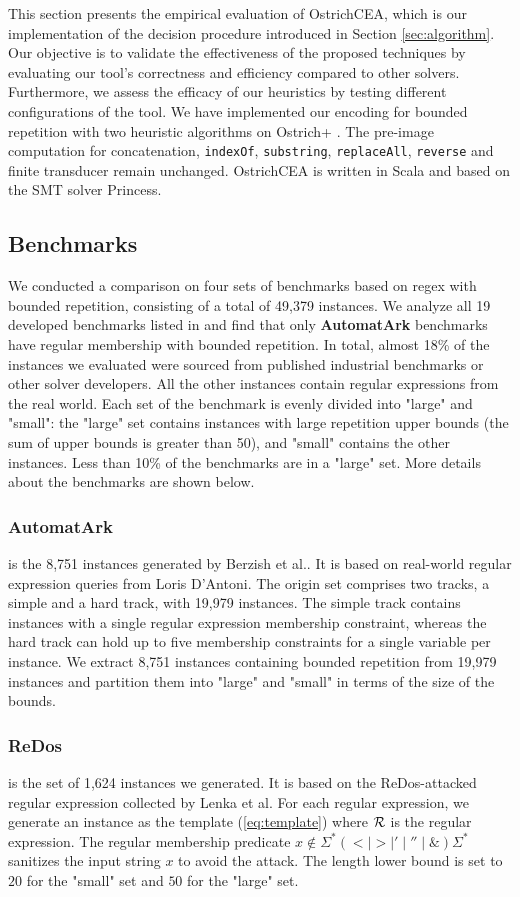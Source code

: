 \documentclass{standalone}
\begin{document}
This section presents the empirical evaluation of OstrichCEA, which is our implementation of the decision procedure introduced in Section \ref{sec:algorithm}. Our objective is to validate the effectiveness of the proposed techniques by evaluating our tool's correctness and efficiency compared to other solvers. Furthermore, we assess the efficacy of our heuristics by testing different configurations of the tool. We have implemented our encoding for bounded repetition with two heuristic algorithms on Ostrich+ \cite{atva2020}. The pre-image computation for concatenation, \verb|indexOf|, \verb|substring|, \verb|replaceAll|, \verb|reverse| and finite transducer remain unchanged. OstrichCEA is written in Scala and based on the SMT solver Princess\cite{princess}.
\subsection{Benchmarks}
We conducted a comparison on four sets of benchmarks based on regex with bounded repetition, consisting of a total of 49,379 instances. We analyze all 19 developed benchmarks listed in \cite{zaligvinder_2021} and find that only \textbf{AutomatArk} benchmarks have regular membership with bounded repetition. In total, almost 18\% of the instances we evaluated were sourced from published industrial benchmarks or other solver developers. All the other instances contain regular expressions from the real world. Each set of the benchmark is evenly divided into "large" and "small": the "large" set contains instances with large repetition upper bounds (the sum of upper bounds is greater than 50), and "small" contains the other instances. Less than 10\% of the benchmarks are in a "large" set. More details about the benchmarks are shown below.
\subsubsection{AutomatArk} is the 8,751 instances generated by Berzish et al.\cite{z3str3re}. It is based on real-world regular expression queries from Loris D'Antoni\cite{automatark}. The origin set comprises two tracks, a simple and a hard track, with 19,979 instances. The simple track contains instances with a single regular expression membership constraint, whereas the hard track can hold up to five membership constraints for a single variable per instance. We extract 8,751 instances containing bounded repetition from 19,979 instances and partition them into "large" and "small" in terms of the size of the bounds.
\subsubsection{ReDos} is the set of 1,624 instances we generated. It is based on the ReDos-attacked regular expression collected by Lenka et al. For each regular expression, we generate an instance as the template (\ref{eq:template}) where $\mathcal{R}$ is the regular expression. The regular membership predicate $x\not\in \Sigma^*(<\mid >\mid '\mid ''\mid \&)\Sigma^*$ sanitizes the input string $x$ to avoid the attack. The length lower bound is set to $20$ for the "small" set and $50$ for the "large" set.
\end{document}
